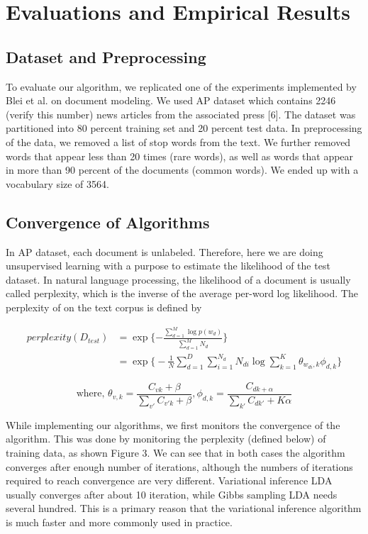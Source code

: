 \documentclass{article} %
\begin{document}
\section{Evaluations and Empirical Results}
\subsection{Dataset and Preprocessing}
To evaluate our algorithm, we replicated one of the experiments implemented by Blei et al. on document modeling. We used AP dataset which contains 2246 (verify this number) news articles from the associated press [6]. The dataset was partitioned into 80 percent training set and 20 percent test data. In preprocessing of the data, we removed a list of stop words from the text. We further removed words that appear less than 20 times (rare words), as well as words that appear in more than 90 percent of the documents (common words). We ended up with a vocabulary size of 3564.

\subsection{Convergence of Algorithms}
In AP dataset, each document is unlabeled. Therefore, here we are doing unsupervised learning with a purpose to estimate the likelihood of the test dataset. In natural language processing, the likelihood of a document is usually called perplexity, which is the inverse of the average per-word log likelihood. The perplexity of on the text corpus is defined by

\begin{align*}
perplexity(D_{test}) &= \exp\Big\{{-\frac{\sum_{d=1}^{M} \log{p(w_d)}}{\sum_{d=1}^{M}N_d}}\Big\}\\
& = \exp \Big\{ -\frac{1}{N}\sum_{d=1}^{D}\sum_{i=1}^{N_d}N_{di}\log \sum_{k=1}^{K}\theta_{w_{di}, k}\phi_{d,k} \Big\}
\end{align*}

$$\text{where, }\theta_{v,k} = \frac{C_{vk}+\beta}{\sum_{v'}C_{v' k}+\beta}, \phi_{d,k} = \frac{C_{dk+\alpha}}{\sum_{k'}C_{dk'}+K\alpha}$$


While implementing our algorithms, we first monitors the convergence of the algorithm. This was done by monitoring the perplexity (defined below) of training data, as shown Figure 3. We can see that in both cases the algorithm converges after enough number of iterations, although the numbers of iterations required to reach convergence are very different. Variational inference LDA usually converges after about 10 iteration, while Gibbs sampling LDA needs several hundred. This is a primary reason that the variational inference algorithm is much faster and more commonly used in practice.
\end{document}
